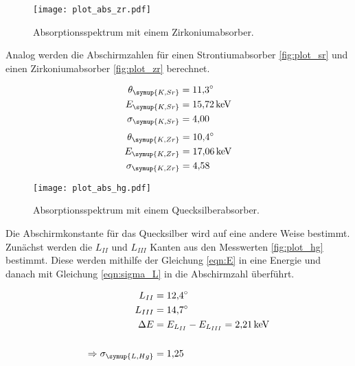 \begin{figure}[H]
  \centering
  \texttt{[image: plot\_abs\_zr.pdf]}
  \caption{Absorptionsspektrum mit einem Zirkoniumabsorber.}
  \label{fig:plot_zr}
\end{figure}

Analog werden die Abschirmzahlen für einen Strontiumabsorber \eqref{fig:plot_sr} und einen
Zirkoniumabsorber \eqref{fig:plot_zr} berechnet.

\begin{align*}
  \theta_\symup{K,Sr} &= \SI{11.3}{\degree}\\
  E_\symup{K,Sr} &= \SI{15.72}{\kilo\eV}\\
  \sigma_\symup{K,Sr} &= \num{4.00}\\
\end{align*}
\begin{align*}
  \theta_\symup{K,Zr} &= \SI{10.4}{\degree}\\
  E_\symup{K,Zr} &= \SI{17.06}{\kilo\eV}\\
  \sigma_\symup{K,Zr} &=\num{4.58}\\
\end{align*}


\begin{figure}[H]
  \centering
  \texttt{[image: plot\_abs\_hg.pdf]}
  \caption{Absorptionsspektrum mit einem Quecksilberabsorber.}
  \label{fig:plot_hg}
\end{figure}

Die Abschirmkonstante für das Quecksilber wird auf eine andere Weise bestimmt. Zunächst
werden die $L_{II}$ und $L_{III}$ Kanten aus den Messwerten \eqref{fig:plot_hg} bestimmt.
Diese werden mithilfe der Gleichung \eqref{eqn:E} in eine Energie und danach
mit Gleichung \eqref{eqn:sigma_L} in die Abschirmzahl überführt.

\begin{align*}
  L_{II} &= \SI{12.4}{\degree}\\
  L_{III}&= \SI{14.7}{\degree}\\
  \Delta E &= E_{L_{II}}-E_{L_{III}} = \SI{2.21}{\kilo\eV}\\\\
  \Rightarrow \sigma_\symup{L,Hg} &= \num{1.25}\\
\end{align*}

